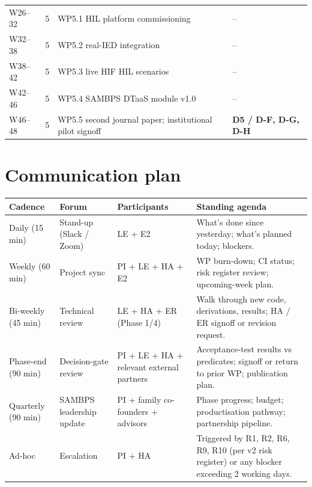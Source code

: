 \documentclass[11pt,a4paper]{article}
\begin{document}
\begin{longtable}{L{1.4cm}C{1.1cm}L{8.0cm}L{3.8cm}}
W26--32 & 5   & WP5.1 HIL platform commissioning                                & --\\
W32--38 & 5   & WP5.2 real-IED integration                                      & --\\
W38--42 & 5   & WP5.3 live HIF HIL scenarios                                    & --\\
W42--46 & 5   & WP5.4 SAMBPS DTaaS module v1.0                                  & --\\
W46--48 & 5   & WP5.5 second journal paper; institutional pilot signoff         & \textbf{D5 / D-F, D-G, D-H}\\
\bottomrule
\end{longtable}

\section{Communication plan}

\renewcommand{\arraystretch}{1.18}
\begin{longtable}{L{2.3cm}L{3.2cm}L{3.6cm}L{6.0cm}}
\toprule{}
\textbf{Cadence} & \textbf{Forum} & \textbf{Participants} & \textbf{Standing agenda}\\\midrule\endhead
Daily (15 min)         & Stand-up (Slack / Zoom) & LE + E2 &
What's done since yesterday; what's planned today; blockers.\\
Weekly (60 min)        & Project sync            & PI + LE + HA + E2 &
WP burn-down; CI status; risk register review; upcoming-week plan.\\
Bi-weekly (45 min)     & Technical review        & LE + HA + ER (Phase 1/4) &
Walk through new code, derivations, results; HA / ER signoff or
revision request.\\
Phase-end (90 min)     & Decision-gate review    & PI + LE + HA + relevant
external partners &
Acceptance-test results vs predicates; signoff or return to prior WP;
publication plan.\\
Quarterly (90 min)     & SAMBPS leadership update & PI + family co-founders + advisors &
Phase progress; budget; productisation pathway; partnership pipeline.\\
Ad-hoc                 & Escalation              & PI + HA &
Triggered by R1, R2, R6, R9, R10 (per v2 risk register) or any blocker
exceeding 2 working days.\\
\bottomrule
\end{longtable}
\end{document}
